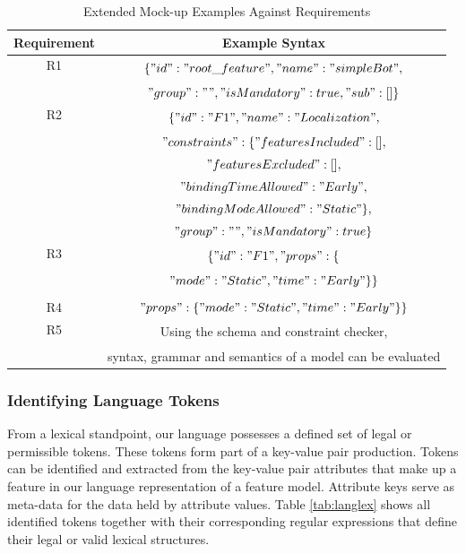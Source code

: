 \documentclass[conference]{IEEEtran}
\begin{document}
\begin{table}[H]
\caption{Extended Mock-up Examples Against Requirements}
\begin{center}
\begin{tabular}{|c|c|}
\hline
    Requirement & Example Syntax  \\ \hline
     R1 & \multirow{2}{*}{$\{"id":"root\_feature","name":"simpleBot",$}\\
                        & \\
                        & $"group": "","isMandatory": true,"sub": []\}$\\ \hline
     R2 & \multirow{2}{*}{$\{"id": "F1","name": "Localization",$}\\ 
                        & \\
                        & $"constraints": \{"featuresIncluded": [],$\\ 
                        & $"featuresExcluded": [],$\\
                        &$"bindingTimeAllowed":"Early",$ \\
                        & $"bindingModeAllowed":"Static"\},$\\ 
                        & $"group": "","isMandatory": true\}$ \\
                         \hline
     R3 &  \multirow{2}{*}{$\{"id": "F1","props": \{$}\\
            & \\
            & $"mode": "Static","time": "Early"\}\}$\\
            & \\
            \hline
     R4 & $"props": \{"mode": "Static","time": "Early"\}\}$\\ \hline
     R5 & \multirow{2}{*}{Using the schema and constraint checker,}\\ 
        & \\
        & syntax, grammar and semantics of a model can be evaluated\\ \hline
\end{tabular}
\label{tab:reqext}
\end{center}
\end{table}

\subsubsection{Identifying Language Tokens}
From a lexical standpoint, our language possesses a defined set of legal or permissible tokens. These tokens form part of a key-value pair production. Tokens can be identified and extracted from the key-value pair attributes that make up a feature in our language representation of a feature model. Attribute keys serve as meta-data for the data held by attribute values. Table \ref{tab:langlex} shows all identified tokens together with their corresponding regular expressions that define their legal or valid lexical structures.
\end{document}
